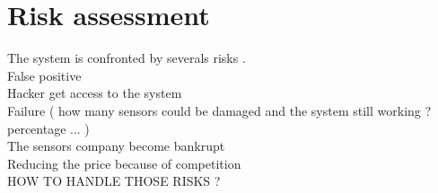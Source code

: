\section{Risk assessment}

The system is confronted by severals risks .\\
False positive \\
Hacker get access to the system \\
Failure ( how many sensors could be damaged and the system still working ? percentage ... ) \\ 
The sensors company become bankrupt \\
Reducing the price because of competition \\

HOW TO HANDLE THOSE RISKS ?